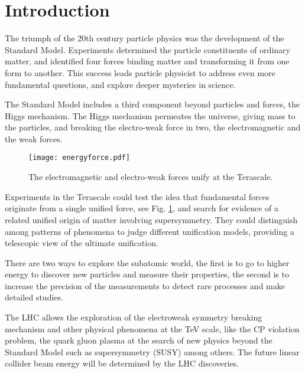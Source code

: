 \chapter*{Introduction}
The triumph of the 20th century particle physics was the development of the Standard Model. Experiments determined the particle constituents of ordinary matter, and identified four forces binding matter and transforming it from one form to another. This success leads particle physicist to address even more fundamental questions, and explore deeper mysteries in science.\par
The Standard Model includes a third component beyond particles and forces, the Higgs mechanism. The Higgs mechanism permeates the universe, giving mass to the particles, and breaking the electro-weak force in two, the electromagnetic and the weak forces.\par
\begin{figure}[!hbt]
\centering
\texttt{[image: energyforce.pdf]}\caption{The electromagnetic and electro-weak forces unify at the Terascale.}\label{f:energyforce}
\end{figure}
Experiments in the Terascale could test the idea that fundamental forces originate from a single unified force, see Fig. \ref{f:energyforce}, and search for evidence of a related unified origin of matter involving supersymmetry. They could distinguish among patterns of phenomena to judge different unification models, providing a telescopic view of the ultimate unification.\par
There are two ways to explore the subatomic world, the first is to go to higher energy to discover new particles and measure their properties, the second is to increase the precision of the measurements to detect rare processes and make detailed studies.\par
The LHC allows the exploration of the electroweak symmetry breaking mechanism and other physical phenomena at the TeV scale, like the CP violation problem, the quark gluon plasma at the search of new physics beyond the Standard Model such as supersymmetry (SUSY) among others. The future linear collider beam energy will be determined by the LHC discoveries.\par
